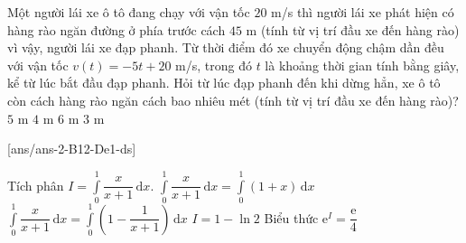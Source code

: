 \begin{ex}%
    Một người lái xe ô tô đang chạy với vận tốc $20$ m/s thì người lái xe phát hiện có hàng rào ngăn đường ở phía trước cách $45$ m (tính từ vị trí đầu xe đến hàng rào) vì vậy, người lái xe đạp phanh. Từ thời điểm đó xe chuyển động chậm dần đều với vận tốc $v(t)=-5 t+20$ m/s, trong đó $t$ là khoảng thời gian tính bằng giây, kể từ lúc bắt đầu đạp phanh. Hỏi từ lúc đạp phanh đến khi dừng hẳn, xe ô tô còn cách hàng rào ngăn cách bao nhiêu mét (tính từ vị trí đầu xe đến hàng rào)?
    \choice 
        {\True $5$ m}
        {$4$ m}
        {$6$ m} 
        {$3$ m}
\end{ex}
[ans/ans-2-B12-De1-ds]
\cauds
\setcounter{ex}{0}
\begin{ex}%
    Tích phân $I=\displaystyle\int\limits_0^1 \dfrac{x}{x+1} \mathrm{\,d}x$.
    \choiceTF
    {$\displaystyle\int\limits_0^1 \dfrac{x}{x+1} \mathrm{\,d} x=\displaystyle\int\limits_0^1\left(1+x\right) \mathrm{\,d}x$}
    {\True $\displaystyle\int\limits_0^1 \dfrac{x}{x+1} \mathrm{\,d} x=\displaystyle\int\limits_0^1\left(1-\dfrac{1}{x+1}\right) \mathrm{\,d} x$}
    {\True $I=1-\ln 2$}
    {Biểu thức $\mathrm{e}^{I}=\dfrac{\mathrm{e}}{4}$}
\end{ex}


